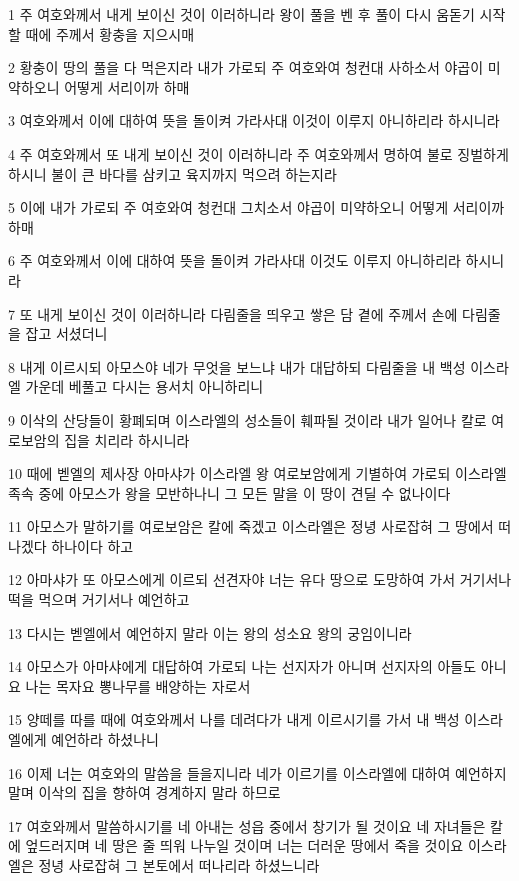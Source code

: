 \par 1 주 여호와께서 내게 보이신 것이 이러하니라 왕이 풀을 벤 후 풀이 다시 움돋기 시작할 때에 주께서 황충을 지으시매
\par 2 황충이 땅의 풀을 다 먹은지라 내가 가로되 주 여호와여 청컨대 사하소서 야곱이 미약하오니 어떻게 서리이까 하매
\par 3 여호와께서 이에 대하여 뜻을 돌이켜 가라사대 이것이 이루지 아니하리라 하시니라
\par 4 주 여호와께서 또 내게 보이신 것이 이러하니라 주 여호와께서 명하여 불로 징벌하게 하시니 불이 큰 바다를 삼키고 육지까지 먹으려 하는지라
\par 5 이에 내가 가로되 주 여호와여 청컨대 그치소서 야곱이 미약하오니 어떻게 서리이까 하매
\par 6 주 여호와께서 이에 대하여 뜻을 돌이켜 가라사대 이것도 이루지 아니하리라 하시니라
\par 7 또 내게 보이신 것이 이러하니라 다림줄을 띄우고 쌓은 담 곁에 주께서 손에 다림줄을 잡고 서셨더니
\par 8 내게 이르시되 아모스야 네가 무엇을 보느냐 내가 대답하되 다림줄을 내 백성 이스라엘 가운데 베풀고 다시는 용서치 아니하리니
\par 9 이삭의 산당들이 황폐되며 이스라엘의 성소들이 훼파될 것이라 내가 일어나 칼로 여로보암의 집을 치리라 하시니라
\par 10 때에 벧엘의 제사장 아마샤가 이스라엘 왕 여로보암에게 기별하여 가로되 이스라엘 족속 중에 아모스가 왕을 모반하나니 그 모든 말을 이 땅이 견딜 수 없나이다
\par 11 아모스가 말하기를 여로보암은 칼에 죽겠고 이스라엘은 정녕 사로잡혀 그 땅에서 떠나겠다 하나이다 하고
\par 12 아마샤가 또 아모스에게 이르되 선견자야 너는 유다 땅으로 도망하여 가서 거기서나 떡을 먹으며 거기서나 예언하고
\par 13 다시는 벧엘에서 예언하지 말라 이는 왕의 성소요 왕의 궁임이니라
\par 14 아모스가 아마샤에게 대답하여 가로되 나는 선지자가 아니며 선지자의 아들도 아니요 나는 목자요 뽕나무를 배양하는 자로서
\par 15 양떼를 따를 때에 여호와께서 나를 데려다가 내게 이르시기를 가서 내 백성 이스라엘에게 예언하라 하셨나니
\par 16 이제 너는 여호와의 말씀을 들을지니라 네가 이르기를 이스라엘에 대하여 예언하지 말며 이삭의 집을 향하여 경계하지 말라 하므로
\par 17 여호와께서 말씀하시기를 네 아내는 성읍 중에서 창기가 될 것이요 네 자녀들은 칼에 엎드러지며 네 땅은 줄 띄워 나누일 것이며 너는 더러운 땅에서 죽을 것이요 이스라엘은 정녕 사로잡혀 그 본토에서 떠나리라 하셨느니라

